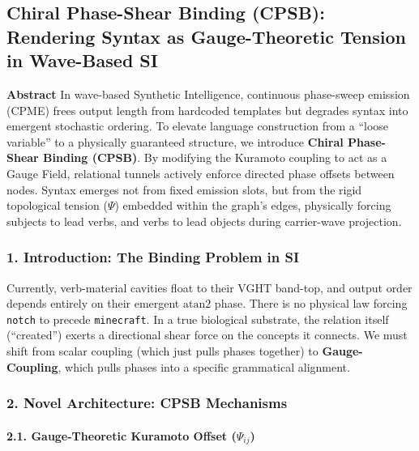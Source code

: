 \documentclass[
  11pt,
  a4paper,
]{article}
\begin{document}
\subsection{Chiral Phase-Shear Binding (CPSB): Rendering Syntax as
Gauge-Theoretic Tension in Wave-Based
SI}\label{chiral-phase-shear-binding-cpsb-rendering-syntax-as-gauge-theoretic-tension-in-wave-based-si}

\textbf{Abstract} In wave-based Synthetic Intelligence, continuous
phase-sweep emission (CPME) frees output length from hardcoded templates
but degrades syntax into emergent stochastic ordering. To elevate
language construction from a ``loose variable'' to a physically
guaranteed structure, we introduce \textbf{Chiral Phase-Shear Binding
(CPSB)}. By modifying the Kuramoto coupling to act as a Gauge Field,
relational tunnels actively enforce directed phase offsets between
nodes. Syntax emerges not from fixed emission slots, but from the rigid
topological tension (\(\Psi\)) embedded within the graph's edges,
physically forcing subjects to lead verbs, and verbs to lead objects
during carrier-wave projection.

\subsubsection{1. Introduction: The Binding Problem in
SI}\label{introduction-the-binding-problem-in-si}

Currently, verb-material cavities float to their VGHT band-top, and
output order depends entirely on their emergent \(\text{atan2}\) phase.
There is no physical law forcing \texttt{notch} to precede
\texttt{minecraft}. In a true biological substrate, the relation itself
(``created'') exerts a directional shear force on the concepts it
connects. We must shift from scalar coupling (which just pulls phases
together) to \textbf{Gauge-Coupling}, which pulls phases into a specific
grammatical alignment.

\subsubsection{2. Novel Architecture: CPSB
Mechanisms}\label{novel-architecture-cpsb-mechanisms}

\paragraph{\texorpdfstring{2.1. Gauge-Theoretic Kuramoto Offset
(\(\Psi_{ij}\))}{2.1. Gauge-Theoretic Kuramoto Offset (\textbackslash Psi\_\{ij\})}}\label{gauge-theoretic-kuramoto-offset-psi_ij}
\end{document}
